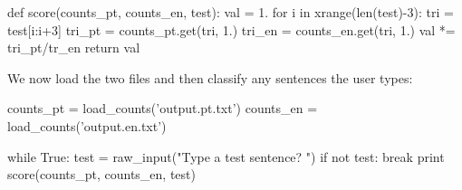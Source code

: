 \begin{python}
def score(counts_pt, counts_en, test):
    val = 1.
    for i in xrange(len(test)-3):
        tri = test[i:i+3]
        tri_pt = counts_pt.get(tri, 1.)
        tri_en = counts_en.get(tri, 1.)
        val *= tri_pt/tr_en
    return val
\end{python}

We now load the two files and then classify any sentences the user types:

\begin{python}
counts_pt = load_counts('output.pt.txt')
counts_en = load_counts('output.en.txt')

while True:
    test = raw_input("Type a test sentence? ")
    if not test: break
    print score(counts_pt, counts_en, test)
\end{python}


